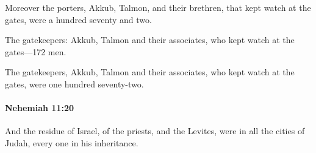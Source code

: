 			\begin{versebox}
					\item[BHS] 
					\item[LXX] 
					\item[ASV] Moreover the porters, Akkub, Talmon, and their brethren, that kept watch at the gates, were a hundred seventy and two.
					\item[NIV] The gatekeepers: Akkub, Talmon and their associates, who kept watch at the gates—172 men.
					\item[NRSV] The gatekeepers, Akkub, Talmon and their associates, who kept watch at the gates, were one hundred seventy-two.
			\end{versebox}

		\paragraph{Nehemiah 11:20} %
			\label{NEHEMIAH-11-20}

			And the residue of Israel, of the priests, and the Levites, were in all the cities of Judah, every one in his inheritance.

